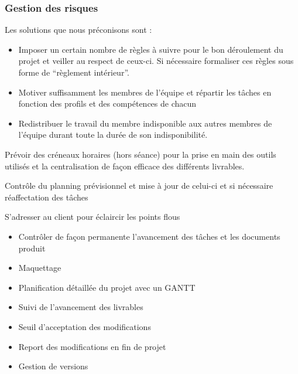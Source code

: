 \subsubsection{Gestion des risques}

\setcounter{solutions}{0}

\newcommand{\solution}[1]{
    \addtocounter{solutions}{1}
    \item[S\thesolutions]{\indent#1}
}

Les solutions que nous préconisons sont :
\begin{description}
    \solution{
        \begin{itemize}
            \item Imposer un certain nombre de règles à suivre pour le bon déroulement du projet et veiller au respect de ceux-ci. Si nécessaire formaliser ces règles sous forme de “règlement intérieur”.
            \item Motiver suffisamment les membres de l’équipe  et répartir les tâches en fonction des profils et des compétences de chacun
            \item Redistribuer le travail du membre indisponible aux autres membres de l’équipe durant toute la durée de son indisponibilité.
        \end{itemize}}
    \solution{
        Prévoir des créneaux horaires (hors séance) pour la prise en main des outils utilisés  et la centralisation de façon efficace des différents livrables.}

    \solution{
        Contrôle du planning prévisionnel et mise à jour de celui-ci et si nécessaire réaffectation des tâches}
    \solution{
        S’adresser au client pour éclaircir les points flous}
    \solution{
        \begin{itemize}
            \item Contrôler de façon permanente l’avancement des tâches et les documents produit
            \item Maquettage
        \end{itemize}}
    \solution{
        \begin{itemize}
            \item Planification détaillée du projet avec un GANTT
            \item Suivi de l’avancement des livrables
        \end{itemize}}
    \solution{
        \begin{itemize}
            \item Seuil d’acceptation des modifications
            \item Report des modifications en fin de projet
            \item Gestion de versions
        \end{itemize}}
\end{description}
